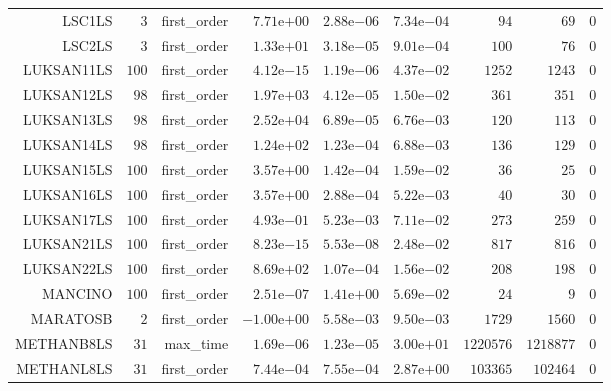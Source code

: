 \begin{longtable}{rrrrrrrrr}
LSC1LS & \(     3\) & first\_order & \( 7.71\)e\(+00\) & \( 2.88\)e\(-06\) & \( 7.34\)e\(-04\) & \(    94\) & \(    69\) & \(     0\) \\
LSC2LS & \(     3\) & first\_order & \( 1.33\)e\(+01\) & \( 3.18\)e\(-05\) & \( 9.01\)e\(-04\) & \(   100\) & \(    76\) & \(     0\) \\
LUKSAN11LS & \(   100\) & first\_order & \( 4.12\)e\(-15\) & \( 1.19\)e\(-06\) & \( 4.37\)e\(-02\) & \(  1252\) & \(  1243\) & \(     0\) \\
LUKSAN12LS & \(    98\) & first\_order & \( 1.97\)e\(+03\) & \( 4.12\)e\(-05\) & \( 1.50\)e\(-02\) & \(   361\) & \(   351\) & \(     0\) \\
LUKSAN13LS & \(    98\) & first\_order & \( 2.52\)e\(+04\) & \( 6.89\)e\(-05\) & \( 6.76\)e\(-03\) & \(   120\) & \(   113\) & \(     0\) \\
LUKSAN14LS & \(    98\) & first\_order & \( 1.24\)e\(+02\) & \( 1.23\)e\(-04\) & \( 6.88\)e\(-03\) & \(   136\) & \(   129\) & \(     0\) \\
LUKSAN15LS & \(   100\) & first\_order & \( 3.57\)e\(+00\) & \( 1.42\)e\(-04\) & \( 1.59\)e\(-02\) & \(    36\) & \(    25\) & \(     0\) \\
LUKSAN16LS & \(   100\) & first\_order & \( 3.57\)e\(+00\) & \( 2.88\)e\(-04\) & \( 5.22\)e\(-03\) & \(    40\) & \(    30\) & \(     0\) \\
LUKSAN17LS & \(   100\) & first\_order & \( 4.93\)e\(-01\) & \( 5.23\)e\(-03\) & \( 7.11\)e\(-02\) & \(   273\) & \(   259\) & \(     0\) \\
LUKSAN21LS & \(   100\) & first\_order & \( 8.23\)e\(-15\) & \( 5.53\)e\(-08\) & \( 2.48\)e\(-02\) & \(   817\) & \(   816\) & \(     0\) \\
LUKSAN22LS & \(   100\) & first\_order & \( 8.69\)e\(+02\) & \( 1.07\)e\(-04\) & \( 1.56\)e\(-02\) & \(   208\) & \(   198\) & \(     0\) \\
MANCINO & \(   100\) & first\_order & \( 2.51\)e\(-07\) & \( 1.41\)e\(+00\) & \( 5.69\)e\(-02\) & \(    24\) & \(     9\) & \(     0\) \\
MARATOSB & \(     2\) & first\_order & \(-1.00\)e\(+00\) & \( 5.58\)e\(-03\) & \( 9.50\)e\(-03\) & \(  1729\) & \(  1560\) & \(     0\) \\
METHANB8LS & \(    31\) & max\_time & \( 1.69\)e\(-06\) & \( 1.23\)e\(-05\) & \( 3.00\)e\(+01\) & \(1220576\) & \(1218877\) & \(     0\) \\
METHANL8LS & \(    31\) & first\_order & \( 7.44\)e\(-04\) & \( 7.55\)e\(-04\) & \( 2.87\)e\(+00\) & \(103365\) & \(102464\) & \(     0\) \\

\end{longtable}
